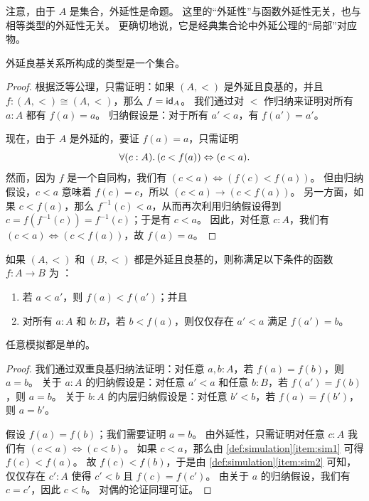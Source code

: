 注意，由于 $A$ 是集合，外延性是命题。
这里的``外延性''与函数外延性无关，也与相等类型的外延性无关。
%
更确切地说，它是经典集合论中外延公理的``局部''对应物。

\begin{thm}
  外延良基关系所构成的类型是一个集合。
\end{thm}

\begin{proof}
  根据泛等公理，只需证明：如果 $(A,<)$ 是外延且良基的，并且 $f:(A,<) \cong (A,<)$，那么 $f=\idfunc[A]$。
  我们通过对 $<$ 作归纳来证明对所有 $a:A$ 都有 $f(a)=a$。
  归纳假设是：对于所有 $a'<a$，有 $f(a')=a'$。

  现在，由于 $A$ 是外延的，要证 $f(a)=a$，只需证明
  \[\fall{c:A}(c<f(a)) \Leftrightarrow (c<a).\]
  然而，因为 $f$ 是一个自同构，我们有 $(c<a) \Leftrightarrow (f(c)<f(a))$。
  但由归纳假设，$c<a$ 意味着 $f(c)=c$，所以 $(c<a) \to (c<f(a))$。
  另一方面，如果 $c<f(a)$，那么 $f^{-1}(c)<a$，从而再次利用归纳假设得到 $c = f(f^{-1}(c)) = f^{-1}(c)$；于是有 $c<a$。
  因此，对任意 $c:A$，我们有 $(c<a) \Leftrightarrow (c<f(a))$，故 $f(a)=a$。
\end{proof}

\begin{defn}\label{def:simulation}
  如果 $(A,<)$ 和 $(B,<)$ 都是外延且良基的，则称满足以下条件的函数 $f:A\to B$ 为
  ：
  \begin{enumerate}
  \item 若 $a<a'$，则 $f(a)<f(a')$；并且\label{item:sim1}
  \item 对所有 $a:A$ 和 $b:B$，若 $b<f(a)$，则仅仅存在 $a'<a$ 满足 $f(a')=b$。\label{item:sim2}
  \end{enumerate}
\end{defn}

\begin{lem}
  任意模拟都是单的。
\end{lem}

\begin{proof}
  我们通过双重良基归纳法证明：对任意 $a,b:A$，若 $f(a)=f(b)$，则 $a=b$。
  关于 $a:A$ 的归纳假设是：对任意 $a'<a$ 和任意 $b:B$，若 $f(a')=f(b)$，则 $a=b$。
  关于 $b:A$ 的内层归纳假设是：对任意 $b'<b$，若 $f(a)=f(b')$，则 $a=b'$。

  假设 $f(a)=f(b)$；我们需要证明 $a=b$。
  由外延性，只需证明对任意 $c:A$ 我们有 $(c<a)\Leftrightarrow (c<b)$。
  如果 $c<a$，那么由 \cref{def:simulation}\ref{item:sim1} 可得 $f(c)<f(a)$。
  故 $f(c)<f(b)$，于是由 \cref{def:simulation}\ref{item:sim2} 可知，仅仅存在 $c':A$ 使得 $c'<b$ 且 $f(c)=f(c')$。
  由关于 $a$ 的归纳假设，我们有 $c=c'$，因此 $c<b$。
  对偶的论证同理可证。
\end{proof}


